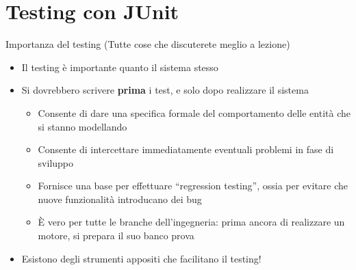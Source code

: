 \documentclass[presentation]{beamer}
\begin{document}
\section{Testing con JUnit}

\begin{frame}{Importanza del testing}
	(Tutte cose che discuterete meglio a lezione)
	\begin{itemize}
		\item Il testing è importante quanto il sistema stesso
		\item Si dovrebbero scrivere \textbf{prima} i test, e solo dopo realizzare il sistema
		\begin{itemize}
			\item Consente di dare una specifica formale del comportamento delle entità che si stanno modellando
			\item Consente di intercettare immediatamente eventuali problemi in fase di sviluppo
			\item Fornisce una base per effettuare ``regression testing'', ossia per evitare che nuove funzionalità introducano dei bug
			\item È vero per tutte le branche dell'ingegneria: prima ancora di realizzare un motore, si prepara il suo banco prova
		\end{itemize}
		\item Esistono degli strumenti appositi che facilitano il testing!
	\end{itemize}
\end{frame}
\end{document}
